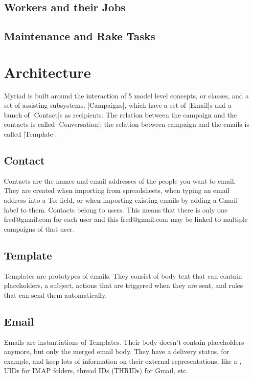 \subsection{Workers and their Jobs}


\subsection{Maintenance and Rake Tasks}


\pagebreak
\section{Architecture}

Myriad is built around the interaction of 5 model level concepts, or classes, and a set of assisting subsystems.
|Campaigns|, which have a set of |Email|s and a bunch of |Contact|s as recipients. The relation between the campaign and the contacts is called |Conversation|; the relation between campaign and the emails is called |Template|.



\subsection{Contact}

Contacts are the names and email addresses of the people you want to email.
They are created when importing from spreadsheets, when typing an email address into a To: field, or when importing existing emails by adding a Gmail label to them. Contacts belong to users. This means that there is only one fred@gmail.com for each user and this fred@gmail.com may be linked to multiple campaigns of that user.

\subsection{Template}

Templates are prototypes of emails. They consist of body text that can contain placeholders, a subject, actions that are triggered when they are sent, and rules that can send them automatically.

\subsection{Email}

Emails are instantiations of Templates. Their body doesn’t contain placeholders anymore, but only the merged email body. They have a delivery status, for example, and keep lots of information on their external representations, like a , UIDs for IMAP folders, thread IDs (THRIDs) for Gmail, etc.

